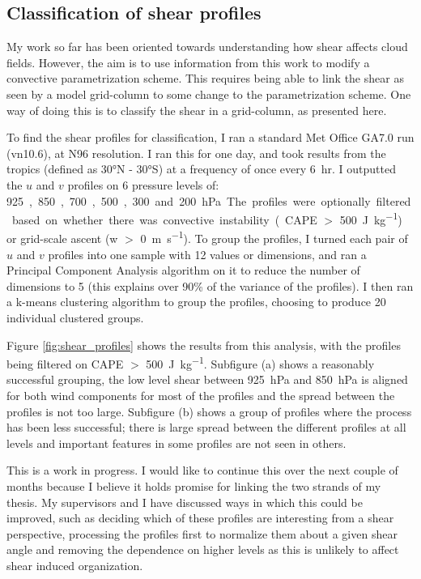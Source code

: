 \documentclass[11pt,a4paper]{article}
\begin{document}
\subsection{Classification of shear profiles}
\label{sec:Classification of shear profiles}

My work so far has been oriented towards understanding how shear affects cloud fields. However, the aim is to use information from this work to modify a convective parametrization scheme. This requires being able to link the shear as seen by a model grid-column to some change to the parametrization scheme. One way of doing this is to classify the shear in a grid-column, as presented here.

To find the shear profiles for classification, I ran a standard Met Office GA7.0 run (vn10.6), at N96 resolution. I ran this for one day, and took results from the tropics (defined as \ang{30}N - \ang{30}S) at a frequency of once every \SI{6}{hr}. I outputted the $u$ and $v$ profiles on 6 pressure levels of: \SI{925}, \SI{850}, \SI{700}, \SI{500}, \SI{300} and \SI{200}{hPa}. The profiles were optionally filtered based on whether there was convective instability (CAPE $>$ \SI{500}{J.kg^{-1}}) or grid-scale ascent (w $>$ \SI{0}{m.s^{-1}}). To group the profiles, I turned each pair of $u$ and $v$ profiles into one sample with 12 values or dimensions, and ran a Principal Component Analysis algorithm on it to reduce the number of dimensions to 5 (this explains over 90\% of the variance of the profiles). I then ran a k-means clustering algorithm to group the profiles, choosing to produce 20 individual clustered groups. 

Figure \ref{fig:shear_profiles} shows the results from this analysis, with the profiles being filtered on CAPE $>$ \SI{500}{J.kg^{-1}}. Subfigure (a) shows a reasonably successful grouping, the low level shear between \SI{925}{hPa} and \SI{850}{hPa} is aligned for both wind components for most of the profiles and the spread between the profiles is not too large. Subfigure (b) shows a group of profiles where the process has been less successful; there is large spread between the different profiles at all levels and important features in some profiles are not seen in others.

This is a work in progress. I would like to continue this over the next couple of months because I believe it holds promise for linking the two strands of my thesis. My supervisors and I have discussed ways in which this could be improved, such as deciding which of these profiles are interesting from a shear perspective, processing the profiles first to normalize them about a given shear angle and removing the dependence on higher levels as this is unlikely to affect shear induced organization.
\end{document}
